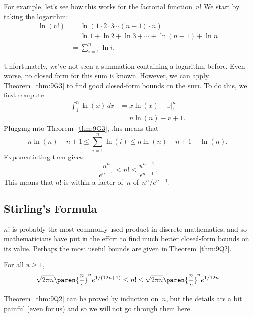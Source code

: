For example, let's see how this works for the factorial
function~$n!$  We start by taking the logarithm:
\begin{align*}
\ln (n!)
       & =  \ln(1 \cdot 2 \cdot 3 \cdots (n-1) \cdot n) \\
       & =  \ln 1 + \ln 2 + \ln 3 + \cdots + \ln(n-1) + \ln n \\
       & =  \sum_{i=1}^n \ln i.
\end{align*}

Unfortunately, we've not seen a summation containing a logarithm
before.  Even worse, no closed form for this sum is known.  However,
we can apply Theorem~\ref{thm:9G3} to find good closed-form bounds on
the sum.  To do this, we first compute
\begin{align*}
\int_1^n \ln(x) \, dx
    &= x \ln(x) - x \Bigr|_1^n \\
    &= n \ln(n) - n + 1.
\end{align*}
Plugging into Theorem~\ref{thm:9G3}, this means that
\begin{equation*}
    n \ln(n) - n + 1
    \le \sum_{i = 1}^n \ln(i)
    \le n \ln(n) - n + 1 + \ln(n).
\end{equation*}
Exponentiating then gives
\begin{equation}\label{eqn:9Q1}
    \frac{n^n}{e^{n - 1}} \le n! \le \frac{n^{n + 1}}{e^{n - 1}}.
\end{equation}
This means that $n!$ is within a factor of~$n$ of~$n^n/e^{n - 1}$.

\subsection{Stirling's Formula}

$n!$ is probably the most commonly used product in discrete
mathematics, and so mathematicians have put in the effort to find much
better closed-form bounds on its value.  Perhaps the most useful
bounds are given in Theorem~\ref{thm:9Q2}.

\begin{theorem}\label{thm:9Q2}
For all $n \ge 1$,
\begin{equation*}
    \sqrt{2 \pi n} \paren{\frac{n}{e}}^n e^{1/(12n + 1)}
    \le n!
    \le \sqrt{2 \pi n} \paren{\frac{n}{e}}^n e^{1/12n}
\end{equation*}
\end{theorem}

Theorem~\ref{thm:9Q2} can be proved by induction on~$n$, but the
details are a bit painful (even for us) and so we will not go through
them here.

